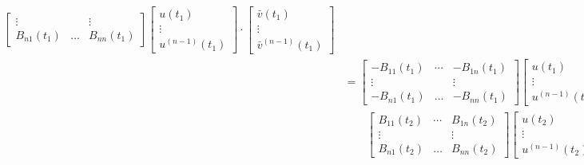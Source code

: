 \documentclass[11pt, oneside, a4paper]{article}
\begin{document}
\begin{rmk}
{\begin{equation}
\begin{split}
\begin{bmatrix}
            \vdots &  & \vdots\\
            B_{n1}(t_1) & \ldots & B_{nn}(t_1)
        \end{bmatrix} 
        \begin{bmatrix}
        u(t_1)\\
        \vdots\\
        u^{(n-1)}(t_1)
        \end{bmatrix}\cdot 
        \begin{bmatrix}
            \bar{v}(t_1)\\
            \vdots\\
            \bar{v}^{(n-1)}(t_1)
        \end{bmatrix}\\
        &= \begin{bmatrix}
            -B_{11}(t_1) & \cdots & -B_{1n}(t_1)\\
            \vdots &  & \vdots\\
            -B_{n1}(t_1) & \ldots & -B_{nn}(t_1)
        \end{bmatrix} 
        \begin{bmatrix}
        u(t_1)\\
        \vdots\\
        u^{(n-1)}(t_1)
        \end{bmatrix}\cdot 
        \begin{bmatrix}
            \bar{v}(t_1)\\
            \vdots\\
            \bar{v}^{(n-1)}(t_1)
        \end{bmatrix} + \\
        &\qquad \begin{bmatrix}
            B_{11}(t_2) & \cdots & B_{1n}(t_2)\\
            \vdots &  & \vdots\\
            B_{n1}(t_2) & \ldots & B_{nn}(t_2)
        \end{bmatrix} 
        \begin{bmatrix}
        u(t_2)\\
        \vdots\\
        u^{(n-1)}(t_2)
        \end{bmatrix}\cdot 
        \begin{bmatrix}
            \bar{v}(t_2)\\
            \vdots\\
            \bar{v}^{(n-1)}(t_2)
        \end{bmatrix}\\

\end{split}
\end{equation}}
\end{rmk}
\end{document}
